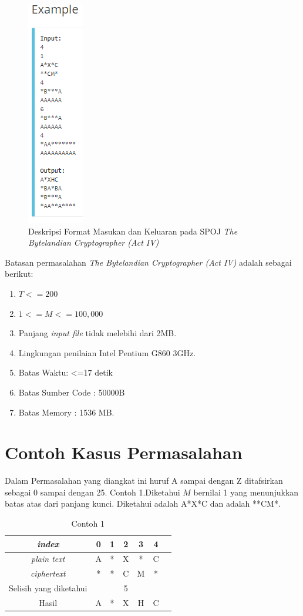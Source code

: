 	\begin{figure}[H]
		\centering
		\includegraphics[scale=0.7]{images/bab2/crypto_io2.png}
		\caption{Deskripsi Format Masukan dan Keluaran pada SPOJ \textit{The Bytelandian Cryptographer (Act IV)}}
		\label{fig:crypto4_io}
	\end{figure}
	
	
	Batasan permasalahan \textit{The Bytelandian Cryptographer (Act IV)} adalah sebagai berikut:
	\begin{enumerate}
		\item $T<=200$
		\item $1<=M<=100,000$
		\item Panjang \textit{input file} tidak melebihi dari 2MB.
		\item Lingkungan penilaian Intel Pentium G860 3GHz.
		\item Batas Waktu: <=17 detik
		\item Batas Sumber Code : 50000B
		\item Batas Memory : 1536 MB.                 
	\end{enumerate}

	\section{Contoh Kasus Permasalahan}
	Dalam Permasalahan yang diangkat ini huruf A sampai dengan Z ditafsirkan sebagai 0 sampai dengan 25.
	Contoh 1.Diketahui $M$ bernilai 1 yang menunjukkan batas atas dari panjang kunci. Diketahui \plaintext adalah A*X*C dan \ciphertext adalah **CM*. 
	\begin{table}[H]
	 	\centering
	 	\begin{tabular}{|c|c|c|c|c|c|c|}\hline
	 	\textit{index}&0&1&2&3&4\\ \hline
	 	\textit{plain text}&A&*&X&*&C\\ \hline
	 	\textit{ciphertext}&*&*&C&M&*\\ \hline
	 	Selisih yang diketahui& & &5& & \\ \hline
	 	Hasil              &A&*&X&H&C\\ \hline
	 	\end{tabular}
	 	\caption{Contoh 1}
	 	\label{tab:contoh1}
	\end{table}
	 
